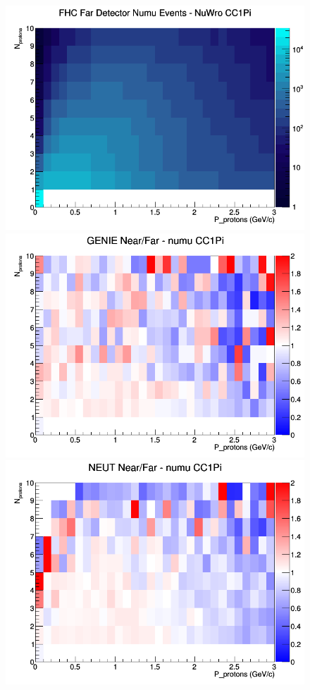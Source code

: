 \begin{figure}[h]
\endminipage
{}
\includegraphics[width=\linewidth]{N_P/nominal/protons/CC1Pi_FHC_FD_numu_N_P_NuWro.png}
\endminipage
\newline
{}
\includegraphics[width=\linewidth]{N_P/nominal/protons/ratios/CC1Pi_GENIE_numu_NF_N_P.png}
\endminipage
{}
\includegraphics[width=\linewidth]{N_P/nominal/protons/ratios/CC1Pi_NEUT_numu_NF_N_P.png}

\end{figure}
